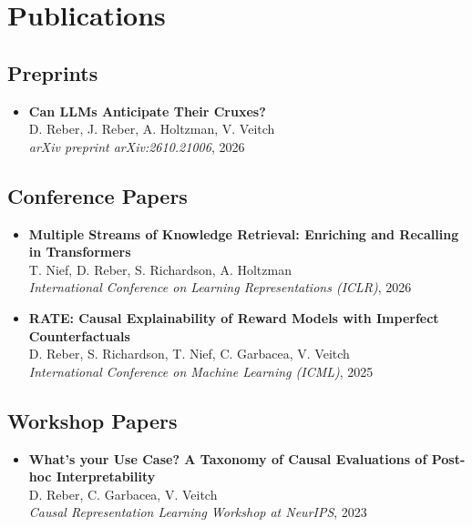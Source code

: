 \documentclass[11pt,letterpaper]{article}
\begin{document}
\section*{Publications}

\subsection*{Preprints}

\begin{itemize}[leftmargin=*]
    \item \textbf{Can LLMs Anticipate Their Cruxes?} \\
    D. Reber, J. Reber, A. Holtzman, V. Veitch \\
    \textit{arXiv preprint arXiv:2610.21006}, 2026
\end{itemize}

\subsection*{Conference Papers}

\begin{itemize}[leftmargin=*]
    \item \textbf{Multiple Streams of Knowledge Retrieval: Enriching and Recalling in Transformers} \\
    T. Nief, D. Reber, S. Richardson, A. Holtzman \\
    \textit{International Conference on Learning Representations (ICLR)}, 2026

    \item \textbf{RATE: Causal Explainability of Reward Models with Imperfect Counterfactuals} \\
    D. Reber, S. Richardson, T. Nief, C. Garbacea, V. Veitch \\
    \textit{International Conference on Machine Learning (ICML)}, 2025
\end{itemize}

\subsection*{Workshop Papers}

\begin{itemize}[leftmargin=*]
    \item \textbf{What's your Use Case? A Taxonomy of Causal Evaluations of Post-hoc Interpretability} \\
    D. Reber, C. Garbacea, V. Veitch \\
    \textit{Causal Representation Learning Workshop at NeurIPS}, 2023
\end{itemize}
\end{document}

